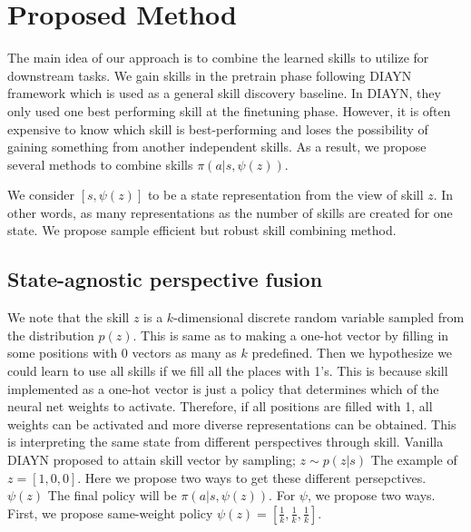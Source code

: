 \section{Proposed Method}
The main idea of our approach is to combine the learned skills to utilize for downstream tasks. 
We gain skills in the pretrain phase following DIAYN \cite{eysenbach2018diversity} framework which is used as a general skill discovery baseline.
In DIAYN, they only used one best performing skill at the finetuning phase.
However, it is often expensive to know which skill is best-performing and loses the possibility of gaining something from another independent skills. 
As a result, we propose several methods to combine skills $\pi(a|s,\psi(z))$.

We consider $[s,\psi(z)]$ to be a state representation from the view of skill $z$.
In other words, as many representations as the number of skills are created for one state.
We propose sample efficient but robust skill combining method.

\subsection{State-agnostic perspective fusion}
We note that the skill $z$ is a $k$-dimensional discrete random variable sampled from the distribution $p(z)$.
This is same as to making a one-hot vector by filling in some positions with 0 vectors as many as $k$ predefined.
Then we hypothesize we could learn to use all skills if we fill all the places with 1's.
This is because skill implemented as a one-hot vector is just a policy that determines which of the neural net weights to activate.
Therefore, if all positions are filled with 1, all weights can be activated and more diverse representations can be obtained.
This is interpreting the same state from different perspectives through skill.
Vanilla DIAYN proposed to attain skill vector by sampling; $z \sim p(z|s)$
The example of $z=[1, 0, 0]$. Here we propose two ways to get these different persepctives. $\psi(z)$
The final policy will be $\pi(a|s,\psi(z))$. For $\psi$, we propose two ways.
First, we propose same-weight policy $\psi(z)=[\frac{1}{k}, \frac{1}{k}, \frac{1}{k}]$.


